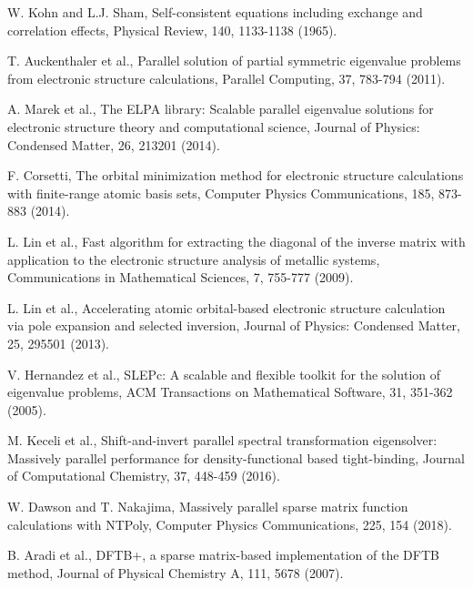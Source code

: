\documentclass{report}
\begin{document}
\begin{thebibliography}{9}
W. Kohn and L.J. Sham, Self-consistent equations including exchange and correlation effects, Physical Review, 140, 1133-1138 (1965).

T. Auckenthaler et al., Parallel solution of partial symmetric eigenvalue problems from electronic structure calculations, Parallel Computing, 37, 783-794 (2011).

A. Marek et al., The ELPA library: Scalable parallel eigenvalue solutions for electronic structure theory and computational science, Journal of Physics: Condensed Matter, 26, 213201 (2014).

F. Corsetti, The orbital minimization method for electronic structure calculations with finite-range atomic basis sets, Computer Physics Communications, 185, 873-883 (2014).

L. Lin et al., Fast algorithm for extracting the diagonal of the inverse matrix with application to the electronic structure analysis of metallic systems, Communications in Mathematical Sciences, 7, 755-777 (2009).

L. Lin et al., Accelerating atomic orbital-based electronic structure calculation via pole expansion and selected inversion, Journal of Physics: Condensed Matter, 25, 295501 (2013).


V. Hernandez et al., SLEPc: A scalable and flexible toolkit for the solution of eigenvalue problems,
ACM Transactions on Mathematical Software, 31, 351-362 (2005).

M. Keceli et al., Shift-and-invert parallel spectral transformation eigensolver: Massively parallel performance for density-functional based tight-binding, Journal of Computational Chemistry, 37, 448-459 (2016).

W. Dawson and T. Nakajima, Massively parallel sparse matrix function calculations with NTPoly, Computer Physics Communications, 225, 154 (2018).

B. Aradi et al., DFTB+, a sparse matrix-based implementation of the DFTB method, Journal of Physical Chemistry A, 111, 5678 (2007).


\end{thebibliography}
\end{document}
